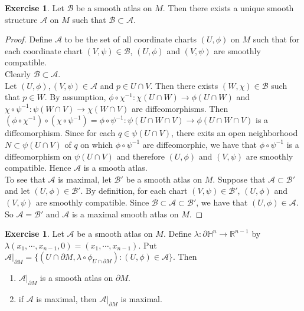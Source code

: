 \documentclass[12pt]{amsart}
\theoremstyle{definition}
\theoremstyle{remark}
\theoremstyle{definition}
\newtheorem{ex}[definition]{Exercise}
\newcommand{\lam}{\lambda}
\renewcommand{\H}{\mathbb{H}}
\newcommand{\R}{\mathbb{R}}
\newcommand{\MA}{\mathcal{A}}
\newcommand{\MB}{\mathcal{B}}
\begin{document}
	\begin{ex}
		Let $\MB$ be a smooth atlas on $M$. Then there exists a unique smooth structure $\MA$ on $M$ such that $\MB \subset \MA$.
	\end{ex}

	\begin{proof}
		Define $\MA$ to be the set of all coordinate charts $(U, \phi)$ on $M$ such that for each coordinate chart $(V, \psi) \in \MB$,  $(U, \phi)$ and $(V, \psi) $ are smoothly compatible. \\
		Clearly $\MB \subset \MA$. \\
		Let $(U, \phi), (V, \psi) \in \MA$ and $p \in U \cap V$. Then there exists $(W, \chi) \in \MB$ such that $p \in W$. By assumption, $\phi \circ \chi^{-1} : \chi(U \cap W) \rightarrow \phi(U \cap W)$ and $ \chi \circ \psi^{-1} : \psi(W \cap V) \rightarrow \chi(W \cap V)$ are diffeomorphisms. Then $ (\phi \circ \chi^{-1}) \circ (\chi \circ \psi^{-1}) = \phi \circ \psi^{-1}: \psi(U \cap W \cap V) \rightarrow  \phi(U \cap W \cap V) $ is a diffeomorphism.  Since for each $q \in \psi(U \cap V)$, there exits an open neighborhood $N \subset \psi(U \cap V)$ of $q$ on which $\phi \circ \psi^{-1}$ are diffeomorphic, we have that $\phi \circ \psi^{-1}$ is a diffeomorphism on $\psi(U \cap V)$ and therefore $(U, \phi)$ and $ (V, \psi)$ are smoothly compatible. Hence $\MA$ is a smooth atlas.\\
		To see that $\MA$ is maximal, let $\MB'$ be a smooth atlas on $M$. Suppose that $\MA \subset \MB'$ and let $(U, \phi) \in \MB'$. By definition, for each chart $(V, \psi) \in \MB'$, $(U, \phi)$ and $(V, \psi)$ are smoothly compatible. Since $\MB \subset \MA \subset \MB'$, we have that $(U, \phi) \in \MA$. So $\MA = \MB'$ and $\MA$ is a maximal smooth atlas on $M$.
	\end{proof}

	\begin{ex}
		Let $\MA$ be a smooth atlas on $M$. Define $\lam: \partial \H^n \rightarrow \R^{n-1}$ by $\lam(x_1, \cdots, x_{n-1}, 0) = (x_1, \cdots, x_{n-1})$. Put $\MA|_{\partial M} = \{(U \cap \partial M, \lam \circ \phi_{U \cap \partial M}): (U, \phi) \in \MA\}$. Then 
		\begin{enumerate}
			\item $\MA|_{\partial M}$ is a smooth atlas on $\partial M$.
			\item if $ \MA $ is maximal, then $\MA|_{\partial M}$ is maximal.
		\end{enumerate}
	\end{ex}
\end{document}
